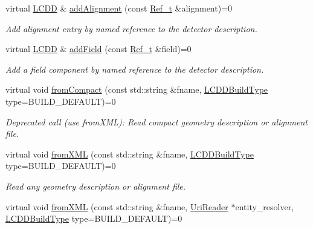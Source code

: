 \begin{DoxyCompactItemize}
virtual \hyperlink{class_d_d4hep_1_1_geometry_1_1_l_c_d_d}{LCDD} \& \hyperlink{class_d_d4hep_1_1_geometry_1_1_l_c_d_d_a50e3654851b950da20f19a13e36fbcc4}{addAlignment} (const \hyperlink{group___d_d4_h_e_p___g_e_o_m_e_t_r_y_ga40af83be6718bb8828a3d83dc7f8c930}{Ref\_\-t} \&alignment)=0
\begin{DoxyCompactList}\small\item\em Add alignment entry by named reference to the detector description. \item\end{DoxyCompactList}\item 
virtual \hyperlink{class_d_d4hep_1_1_geometry_1_1_l_c_d_d}{LCDD} \& \hyperlink{class_d_d4hep_1_1_geometry_1_1_l_c_d_d_a91ae6cfee73a663c46f296bc403b5c63}{addField} (const \hyperlink{group___d_d4_h_e_p___g_e_o_m_e_t_r_y_ga40af83be6718bb8828a3d83dc7f8c930}{Ref\_\-t} \&field)=0
\begin{DoxyCompactList}\small\item\em Add a field component by named reference to the detector description. \item\end{DoxyCompactList}\item 
virtual void \hyperlink{class_d_d4hep_1_1_geometry_1_1_l_c_d_d_abc18ac1b03188da6e4400943eca4bd2e}{fromCompact} (const std::string \&fname, \hyperlink{namespace_d_d4hep_acafe43ba4537ab6e999e808142965fab}{LCDDBuildType} type=BUILD\_\-DEFAULT)=0
\begin{DoxyCompactList}\small\item\em Deprecated call (use fromXML): Read compact geometry description or alignment file. \item\end{DoxyCompactList}\item 
virtual void \hyperlink{class_d_d4hep_1_1_geometry_1_1_l_c_d_d_ad6e8de7ab4f0374cea7e3e15e33af66e}{fromXML} (const std::string \&fname, \hyperlink{namespace_d_d4hep_acafe43ba4537ab6e999e808142965fab}{LCDDBuildType} type=BUILD\_\-DEFAULT)=0
\begin{DoxyCompactList}\small\item\em Read any geometry description or alignment file. \item\end{DoxyCompactList}\item 
virtual void \hyperlink{class_d_d4hep_1_1_geometry_1_1_l_c_d_d_aab90efbd334c08ee8a06b0f97d219243}{fromXML} (const std::string \&fname, \hyperlink{class_d_d4hep_1_1_x_m_l_1_1_uri_reader}{UriReader} $\ast$entity\_\-resolver, \hyperlink{namespace_d_d4hep_acafe43ba4537ab6e999e808142965fab}{LCDDBuildType} type=BUILD\_\-DEFAULT)=0

\end{DoxyCompactItemize}
